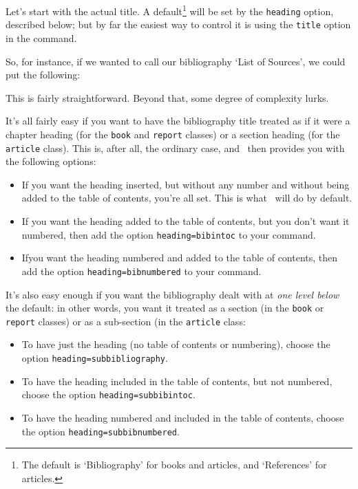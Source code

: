 Let's start with the actual title. A default\footnote{The default is
  `Bibliography' for books and articles, and `References' for
  articles.} will be set by the \verb|heading| option, described
below; but by far the easiest way to control it is using the
\verb|title| option in the  command.

So, for instance, if we wanted to call our bibliography `List of
Sources', we could put the following:
\begin{center}
\end{center}

This is fairly straightforward. Beyond that, some degree of complexity
lurks.

It's all fairly easy if you want to have the bibliography title
treated as if it were a chapter heading (for the \verb|book| and
\verb|report| classes) or a section heading (for the \verb|article|
class). This is, after all, the ordinary case, and \biblatex\ then
provides you with the following options:
\begin{itemize}
\item If you want the heading inserted, but without any
  number and without being added to the table of contents, you're all
  set. This is what \biblatex\ will do by default.
\item If you want the heading added to the table of contents,
  but you don't want it numbered, then add the option
  \verb|heading=bibintoc| to your  command.
\item Ifyou want the heading numbered and added to the table
  of contents, then add the option \verb|heading=bibnumbered| to your
   command.
\end{itemize}

It's also easy enough if you want the bibliography dealt with at
\emph{one level below} the default: in other words, you want it
treated as a section (in the \verb|book| or \verb|report| classes) or
as a sub-section (in the \verb|article| class:
\begin{itemize}
\item To have just the heading (no table of contents or numbering),
  choose the option \verb|heading=subbibliography|.
\item To have the heading included in the table of contents, but not
  numbered, choose the option \verb|heading=subbibintoc|.
\item To have the heading numbered and included in the table of
  contents, choose the option \verb|heading=subbibnumbered|.
\end{itemize}

